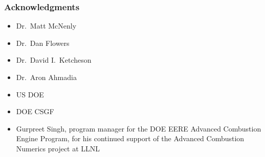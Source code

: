 \documentclass [14pt]{beamer}
\begin{document}


\begin{frame}
\frametitle{Acknowledgments}
\begin{itemize}
\item Dr.\ Matt McNenly
\item Dr.\ Dan Flowers
\item Dr.\ David I.\ Ketcheson
\item Dr.\ Aron Ahmadia
\item US DOE
\item DOE CSGF
\item Gurpreet Singh, program manager for the DOE EERE Advanced
  Combustion Engine Program, for his continued support of the Advanced
  Combustion Numerics project at LLNL
\end{itemize}
\end{frame}

\begin{frame}
\end{frame}
\end{document}
